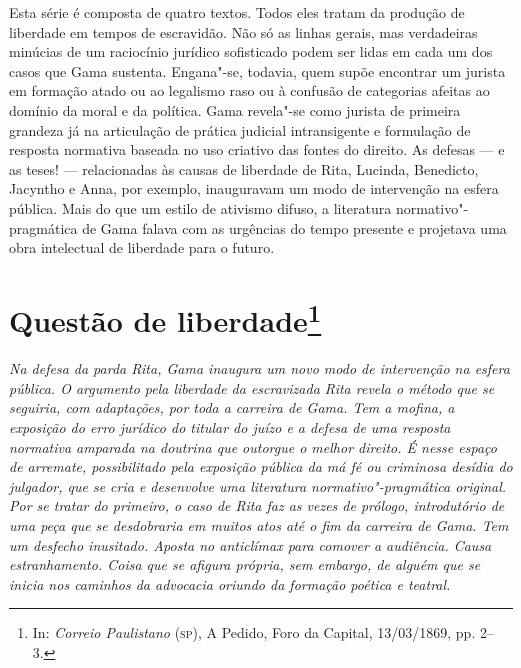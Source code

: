 \mbox{}\vfill
\thispagestyle{empty}
{\footnotesize\noindent
Esta série é composta de quatro textos. Todos eles tratam da
produção de liberdade em tempos de escravidão. Não só as linhas gerais,
mas verdadeiras minúcias de um raciocínio jurídico sofisticado podem ser
lidas em cada um dos casos que Gama sustenta. Engana"-se, todavia, quem
supõe encontrar um jurista em formação atado ou ao legalismo raso ou à
confusão de categorias afeitas ao domínio da moral e da política. Gama
revela"-se como jurista de primeira grandeza já na articulação de prática
judicial intransigente e formulação de resposta normativa baseada no uso
criativo das fontes do direito. As defesas --- e as teses! ---
relacionadas às causas de liberdade de Rita, Lucinda, Benedicto,
Jacyntho e Anna, por exemplo, inauguravam um modo de intervenção na
esfera pública. Mais do que um estilo de ativismo difuso, a literatura
normativo"-pragmática de Gama falava com as urgências do tempo presente e
projetava uma obra intelectual de liberdade para o futuro.}
\@openrighttrue\makeatother \endgroup



\chapter{Questão de liberdade\footnote[*]{In: \emph{Correio
  Paulistano} (\textsc{sp}), A Pedido, Foro da Capital, 13/03/1869, pp. 2--3.}}

\begin{flushleft}
{\footnotesize\itshape
Na defesa da parda Rita, Gama inaugura um novo modo de intervenção
na esfera pública. O argumento pela liberdade da escravizada Rita revela
o método que se seguiria, com adaptações, por toda a carreira de Gama.
Tem a mofina, a exposição do erro jurídico do titular do juízo e a
defesa de uma resposta normativa amparada na doutrina que outorgue o
melhor direito. É nesse espaço de arremate, possibilitado
pela exposição pública da má fé ou criminosa desídia do julgador, que se
cria e desenvolve uma literatura normativo"-pragmática original. Por se
tratar do primeiro, o caso de Rita faz as vezes de prólogo, introdutório
de uma peça que se desdobraria em muitos atos até o fim da carreira de
Gama. Tem um desfecho inusitado. Aposta no anticlímax para comover a
audiência. Causa estranhamento. Coisa que se afigura própria, sem
embargo, de alguém que se inicia nos caminhos da advocacia oriundo da
formação poética e teatral. }
\end{flushleft}

